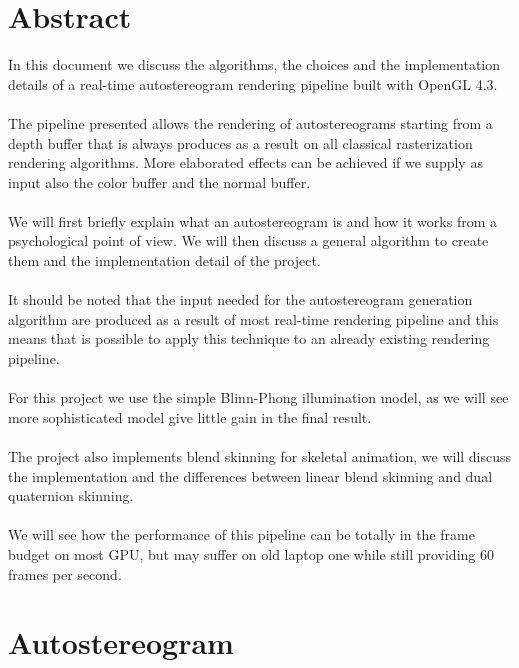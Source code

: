 \documentclass[12pt, a4paper]{article}
\begin{document}
\section{Abstract}
In this document we discuss the algorithms, the choices and the implementation details of a real-time autostereogram rendering pipeline built with OpenGL 4.3.\\\\
The pipeline presented allows the rendering of autostereograms starting from a depth buffer that is always produces
as a result on all classical rasterization rendering algorithms. More elaborated effects can be achieved if we supply as input also the color buffer and 
the normal buffer.\\\\
We will first briefly explain what an autostereogram is and how it works from a psychological point of view. 
We will then discuss a general algorithm to create them and the implementation detail of the project.\\\\
It should be noted that the input needed for the autostereogram generation algorithm are produced as a result of most real-time rendering pipeline and this 
means that is possible to apply this technique to an already existing rendering pipeline.\\\\
For this project we use the simple Blinn-Phong illumination model, as we will see more sophisticated model give little gain in 
the final result.\\\\
The project also implements blend skinning for skeletal animation, we will discuss the implementation and the differences between linear blend skinning and
dual quaternion skinning.\\\\
We will see how the performance of this pipeline can be totally in the frame budget on most GPU, but may suffer on old laptop one while still
providing 60 frames per second.

\clearpage
\section{Autostereogram}
\end{document}
